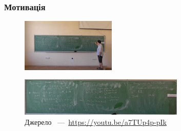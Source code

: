 \begin{frame}
    \frametitle{Мотивація}
    \begin{figure}
        \includegraphics[width=0.4\textwidth]{images/before.png}
    \end{figure}
    \begin{figure}
        \includegraphics[width=0.7\textwidth]{images/after.png}
        \caption{Джерело ~---~\url{https://youtu.be/a7TUp4p-pIk}
        }
    \end{figure}

\end{frame}
